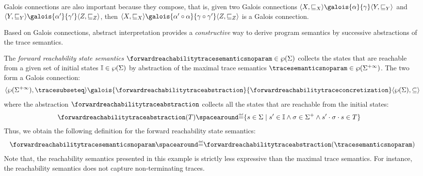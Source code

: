 Galois connections are also important because they compose, that is, given two Galois connections $\tuple{X}{\sqsubseteq_X}\galois{\abstraction}{\concretization}\tuple{Y}{\sqsubseteq_Y}$ and $\tuple{Y}{\sqsubseteq_Y}\galois{\abstraction'}{\concretization'}\tuple{Z}{\sqsubseteq_Z}$, then $\tuple{X}{\sqsubseteq_X}\galois{\abstraction' \circ \abstraction}{\concretization \circ \concretization'}\tuple{Z}{\sqsubseteq_Z}$ is a Galois connection.

Based on Galois connections, abstract interpretation provides a \emph{constructive} way to derive program semantics by successive abstractions of the trace semantics.

\begin{example}
  The \emph{forward reachability state semantics} $\forwardreachabilitytracesemanticsnoparam\in\forwardreachabilitytracetype$ collects the states that are reachable from a given set of initial states $\mathbb{I}\in\wp(\Sigma)$ by abstraction of the maximal trace semantics $\tracesemanticsnoparam\in\tracetype$. The two form a Galois connection:
  \begin{align*}
    \tuple{\tracetype}{\tracesubseteq}\galois{\forwardreachabilitytraceabstraction}{\forwardreachabilitytraceconcretization}\tuple{\forwardreachabilitytracetype}{\forwardreachabilitytracesubseteq}
  \end{align*}
  where the abstraction $\forwardreachabilitytraceabstraction$ collects all the states that are reachable from the initial states:
  \begin{align*}
    \forwardreachabilitytraceabstraction(\defsetoftraces) &\DefeQ \setdef{\defstate\in\state}{ \defstate'\in\initialstates \land \deftrace\in\finitesequences \land \concat{\concat{\defstate'}{\deftrace}}{\defstate} \in \defsetoftraces}
  \end{align*}
Thus, we obtain the following definition for the forward reachability state semantics:
\[ \forwardreachabilitytracesemanticsnoparam \DefeQ \forwardreachabilitytraceabstraction(\tracesemanticsnoparam) \]
Note that, the reachability semantics presented in this example is strictly less expressive than the maximal trace semantics. For instance, the reachability semantics does not capture non-terminating traces.
\end{example}


